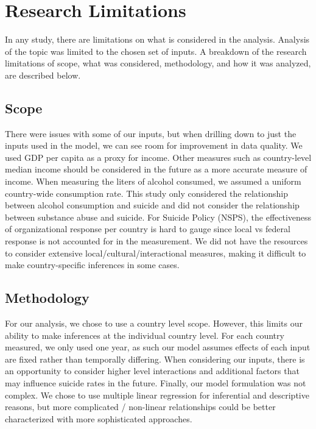 \documentclass[]{article}
\begin{document}
\section{Research Limitations}\label{research-limitations}

In any study, there are limitations on what is considered in the
analysis. Analysis of the topic was limited to the chosen set of inputs.
A breakdown of the research limitations of scope, what was considered,
methodology, and how it was analyzed, are described below.

\subsection{Scope}\label{scope}

There were issues with some of our inputs, but when drilling down to
just the inputs used in the model, we can see room for improvement in
data quality. We used GDP per capita as a proxy for income. Other
measures such as country-level median income should be considered in the
future as a more accurate measure of income. When measuring the liters
of alcohol consumed, we assumed a uniform country-wide consumption rate.
This study only considered the relationship between alcohol consumption
and suicide and did not consider the relationship between substance
abuse and suicide. For Suicide Policy (NSPS), the effectiveness of
organizational response per country is hard to gauge since local vs
federal response is not accounted for in the measurement. We did not
have the resources to consider extensive local/cultural/interactional
measures, making it difficult to make country-specific inferences in
some cases.

\subsection{Methodology}\label{methodology}

For our analysis, we chose to use a country level scope. However, this
limits our ability to make inferences at the individual country level.
For each country measured, we only used one year, as such our model
assumes effects of each input are fixed rather than temporally
differing. When considering our inputs, there is an opportunity to
consider higher level interactions and additional factors that may
influence suicide rates in the future. Finally, our model formulation
was not complex. We chose to use multiple linear regression for
inferential and descriptive reasons, but more complicated / non-linear
relationships could be better characterized with more sophisticated
approaches.
\end{document}
